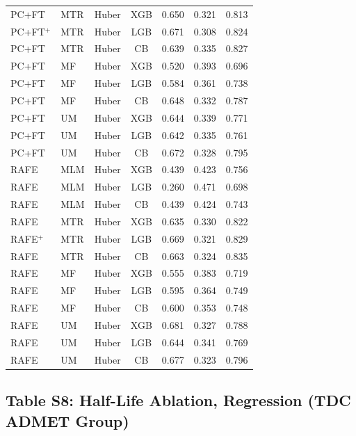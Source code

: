 \documentclass[9pt,a4paper]{article}
\begin{document}
\begin{scriptsize}
\begin{longtable}{lllcrrr}
PC+FT & MTR & Huber & XGB & 0.650 & 0.321 & 0.813 \\
PC+FT$^+$ & MTR & Huber & LGB & 0.671 & 0.308 & 0.824 \\
PC+FT & MTR & Huber & CB  & 0.639 & 0.335 & 0.827 \\
PC+FT & MF  & Huber & XGB & 0.520 & 0.393 & 0.696 \\
PC+FT & MF  & Huber & LGB & 0.584 & 0.361 & 0.738 \\
PC+FT & MF  & Huber & CB  & 0.648 & 0.332 & 0.787 \\
PC+FT & UM  & Huber & XGB & 0.644 & 0.339 & 0.771 \\
PC+FT & UM  & Huber & LGB & 0.642 & 0.335 & 0.761 \\
PC+FT & UM  & Huber & CB  & 0.672 & 0.328 & 0.795 \\
\midrule
RAFE & MLM & Huber & XGB & 0.439 & 0.423 & 0.756 \\
RAFE & MLM & Huber & LGB & 0.260 & 0.471 & 0.698 \\
RAFE & MLM & Huber & CB  & 0.439 & 0.424 & 0.743 \\
RAFE & MTR & Huber & XGB & 0.635 & 0.330 & 0.822 \\
RAFE$^{+}$ & MTR & Huber & LGB & 0.669 & 0.321 & 0.829 \\
RAFE & MTR & Huber & CB & 0.663 & 0.324 & 0.835 \\
RAFE & MF  & Huber & XGB & 0.555 & 0.383 & 0.719 \\
RAFE & MF  & Huber & LGB & 0.595 & 0.364 & 0.749 \\
RAFE & MF  & Huber & CB  & 0.600 & 0.353 & 0.748 \\
RAFE & UM  & Huber & XGB & 0.681 & 0.327 & 0.788 \\
RAFE & UM  & Huber & LGB & 0.644 & 0.341 & 0.769 \\
RAFE & UM  & Huber & CB  & 0.677 & 0.323 & 0.796 \\
\end{longtable}
\end{scriptsize}

\newpage

\subsection*{Table S8: Half-Life Ablation, Regression (TDC ADMET Group)}
\end{document}
